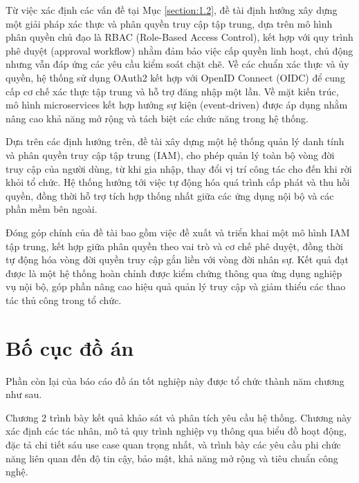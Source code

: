 \documentclass[../DoAn.tex]{subfiles}
\begin{document}

Từ việc xác định các vấn đề tại Mục \ref{section:1.2}, đề tài định hướng xây dựng một giải pháp xác thực và phân quyền truy cập tập trung, dựa trên mô hình phân quyền chủ đạo là RBAC (Role-Based Access Control), kết hợp với quy trình phê duyệt (approval workflow) nhằm đảm bảo việc cấp quyền linh hoạt, chủ động nhưng vẫn đáp ứng các yêu cầu kiểm soát chặt chẽ. Về các chuẩn xác thực và ủy quyền, hệ thống sử dụng OAuth2 kết hợp với OpenID Connect (OIDC) để cung cấp cơ chế xác thực tập trung và hỗ trợ đăng nhập một lần. Về mặt kiến trúc, mô hình microservices kết hợp hướng sự kiện (event-driven) được áp dụng nhằm nâng cao khả năng mở rộng và tách biệt các chức năng trong hệ thống.

Dựa trên các định hướng trên, đề tài xây dựng một hệ thống quản lý danh tính và phân quyền truy cập tập trung (IAM), cho phép quản lý toàn bộ vòng đời truy cập của người dùng, từ khi gia nhập, thay đổi vị trí công tác cho đến khi rời khỏi tổ chức. Hệ thống hướng tới việc tự động hóa quá trình cấp phát và thu hồi quyền, đồng thời hỗ trợ tích hợp thống nhất giữa các ứng dụng nội bộ và các phần mềm bên ngoài.

Đóng góp chính của đề tài bao gồm việc đề xuất và triển khai một mô hình IAM tập trung, kết hợp giữa phân quyền theo vai trò và cơ chế phê duyệt, đồng thời tự động hóa vòng đời quyền truy cập gắn liền với vòng đời nhân sự. Kết quả đạt được là một hệ thống hoàn chỉnh được kiểm chứng thông qua ứng dụng nghiệp vụ nội bộ, góp phần nâng cao hiệu quả quản lý truy cập và giảm thiểu các thao tác thủ công trong tổ chức.


\section{Bố cục đồ án}
\label{section:1.4}

Phần còn lại của báo cáo đồ án tốt nghiệp này được tổ chức thành năm chương như sau.

Chương 2 trình bày kết quả khảo sát và phân tích yêu cầu hệ thống. Chương này xác định các tác nhân, mô tả quy trình nghiệp vụ thông qua biểu đồ hoạt động, đặc tả chi tiết sáu use case quan trọng nhất, và trình bày các yêu cầu phi chức năng liên quan đến độ tin cậy, bảo mật, khả năng mở rộng và tiêu chuẩn công nghệ.
\end{document}
